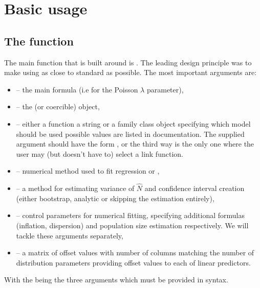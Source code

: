\documentclass[
]{jss}
\newcommand{\1}{\mathcal{I}} \newcommand{\bZero}{\boldsymbol{0}}
\begin{document}
\section{Basic usage}\label{sec-basic}

\subsection[The]{The 
function}\label{estimatePopsize-function}

The main function that  is built around is
. The leading design principle was to make using
 as close to standard  as
possible. The most important arguments are:

\begin{itemize}
    \item {} -- the main formula (i.e for the Poisson $\lambda$ parameter),
    \item {} -- the  (or  coercible) object,
    \item {} -- either a function a string or a family class object specifying which model should be used possible values are listed in documentation. The supplied argument should have the form ,  or  the third way is the only one where the user may (but doesn't have to) select a link function.
    \item {} -- numerical method used to fit regression  or ,
    \item {} -- a method for estimating variance of $\hat{N}$ and confidence interval creation (either bootstrap, analytic or skipping the estimation entirely),
    \item {} -- control parameters for numerical fitting, specifying additional formulas (inflation, dispersion) and population size estimation respectively. We will tackle these arguments separately,
    \item {} -- a matrix of offset values with number of columns matching the number of distribution parameters providing offset values to each of linear predictors.
\end{itemize}

With the  being the three arguments which
must be provided in  syntax.
\end{document}
